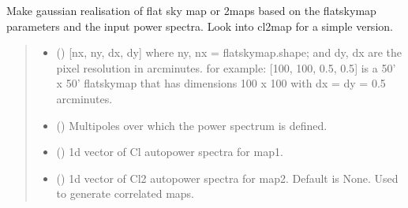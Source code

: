 \documentclass[letterpaper,10pt,english]{sphinxmanual}
\begin{document}

\begin{fulllineitems}
\label{\detokenize{flatsky:flatsky.make_gaussian_realisation}}
\pysigstartsignatures
{}
\pysigstopsignatures
\sphinxAtStartPar
Make gaussian realisation of flat sky map or 2maps based on the flatskymap parameters and the input power spectra.
Look into cl2map for a simple version.
\begin{quote}\begin{description}
\begin{itemize}
\item {} 
\sphinxAtStartPar
{} () \textendash{} {[}nx, ny, dx, dy{]} where ny, nx = flatskymap.shape; and dy, dx are the pixel resolution in arcminutes.
for example: {[}100, 100, 0.5, 0.5{]} is a 50’ x 50’ flatskymap that has dimensions 100 x 100 with dx = dy = 0.5 arcminutes.

\item {} 
\sphinxAtStartPar
{} () \textendash{} Multipoles over which the power spectrum is defined.

\item {} 
\sphinxAtStartPar
{} () \textendash{} 1d vector of Cl auto\sphinxhyphen{}power spectra for map1.

\item {} 
\sphinxAtStartPar
{} (\sphinxstyleliteralemphasis{\sphinxupquote{ (}}\sphinxstyleliteralemphasis{\sphinxupquote{)}}) \textendash{} 1d vector of Cl2 auto\sphinxhyphen{}power spectra for map2.
Default is None. Used to generate correlated maps.


\end{itemize}
\end{description}
\end{quote}
\end{fulllineitems}
\end{document}
